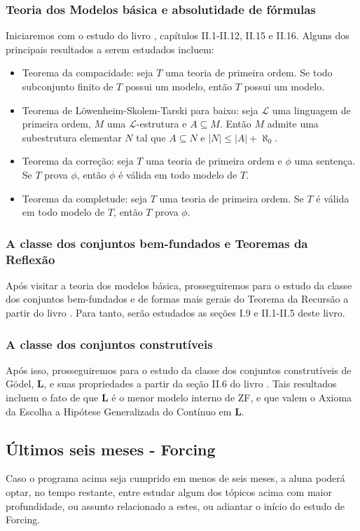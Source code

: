 \documentclass{article}
\begin{document}
    \subsubsection{Teoria dos Modelos básica e absolutidade de fórmulas}
    Iniciaremos com o estudo do livro \cite{kunen2009foundations}, capítulos II.1-II.12, II.15 e II.16. Alguns dos principais resultados a serem estudados incluem:
    \begin{itemize}
        \item Teorema da compacidade: seja $T$ uma teoria de primeira ordem. Se todo subconjunto finito de $T$ possui um modelo, então $T$ possui um modelo.
        \item Teorema de Löwenheim-Skolem-Tarski para baixo: seja $\mathcal L$ uma linguagem de primeira ordem, $M$ uma $\mathcal L$-estrutura e $A\subseteq M$. Então $M$ admite uma subestrutura elementar $N$ tal que $A\subseteq N$ e $|N|\leq |A|+\aleph_0$.
        \item Teorema da correção: seja $T$ uma teoria de primeira ordem e $\phi$ uma sentença. Se $T$ prova $\phi$, então $\phi$ é válida em todo modelo de $T$.
        \item Teorema da completude: seja $T$ uma teoria de primeira ordem. Se $T$ é válida em todo modelo de $T$, então $T$ prova $\phi$.
    \end{itemize}
    \subsubsection{A classe dos conjuntos bem-fundados e Teoremas da Reflexão}
    Após visitar a teoria dos modelos básica, prosseguiremos para o estudo da classe dos conjuntos bem-fundados e de formas mais gerais do Teorema da Recursão a partir do livro \cite{kunen2011set}. Para tanto, serão estudados as seções I.9 e II.1-II.5 deste livro.
    \subsubsection{A classe dos conjuntos construtíveis}
    Após isso, prosseguiremos para o estudo da classe dos conjuntos construtíveis de Gödel, $\mathbf{L}$, e suas propriedades a partir da seção II.6 do livro \cite{kunen2011set}. Tais resultados incluem o fato de que $\mathbf L$ é o menor modelo interno de ZF, e que valem o Axioma da Escolha a Hipótese Generalizada do Contínuo em $\mathbf L$.
    \subsection{Últimos seis meses - Forcing}
    Caso o programa acima seja cumprido em menos de seis meses, a aluna poderá optar, no tempo restante, entre estudar algum dos tópicos acima com maior profundidade, ou assunto relacionado a estes, ou adiantar o início do estudo de Forcing.
\end{document}
